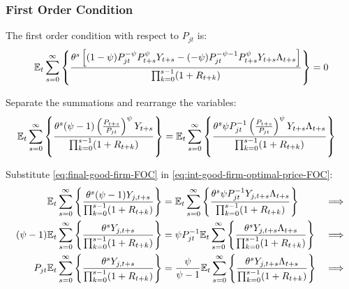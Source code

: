\documentclass[
thesis.tex
]{subfiles}
\begin{document}
	
	\subsubsection*{First Order Condition}
	
	The first order condition with respect to $P_{jt}$ is:
	\begin{align}
		& \quad {\mathbb{E}_{t}} \sum_{s=0}^{\infty} \left\{ \frac{\theta^s \left[ (1-\psi) P_{jt}^{-\psi} P_{t+s}^{\psi} Y_{t+s} - (-\psi) P_{jt}^{-\psi-1} P_{t+s}^{\psi} Y_{t+s} \Lambda_{t+s} \right] }{\prod_{k=0}^{s-1}(1+R_{t+k})} \right\} = 0 \nonumber
	\end{align}
	
	
	Separate the summations and rearrange the variables:
	\begin{align}
		\label{eq:int-good-firm-optimal-price-FOC}
		& {\mathbb{E}_{t}} \sum_{s=0}^{\infty} \left\{ \frac{\theta^s (\psi-1) \left( \frac{P_{t+s}} {P_{jt}} \right)^{\psi} Y_{t+s}} {\prod_{k=0}^{s-1} (1+R_{t+k})} \right\} = {\mathbb{E}_{t}} \sum_{s=0}^{\infty} \left\{ \frac{\theta^s \psi P_{jt}^{-1} \left( \frac{P_{t+s}} {P_{jt}} \right)^{\psi} Y_{t+s} \Lambda_{t+s} }{\prod_{k=0}^{s-1}(1+R_{t+k})} \right\}
	\end{align}
	
	
	Substitute \ref{eq:final-good-firm-FOC} in \ref{eq:int-good-firm-optimal-price-FOC}:
	\begin{alignat}{2}
		{\mathbb{E}_{t}} \sum_{s=0}^{\infty} \Bigg\{ \frac{\theta^s (\psi-1) Y_{j,t+s}}{\prod_{k=0}^{s-1}(1+R_{t+k})} \Bigg\} &= {\mathbb{E}_{t}} \sum_{s=0}^{\infty} \Bigg\{ \frac{\theta^s \psi P_{jt}^{-1} Y_{j,t+s} \Lambda_{t+s}}{\prod_{k=0}^{s-1}(1+R_{t+k})}  \Bigg\} &\implies \nonumber \\
		(\psi-1) {\mathbb{E}_{t}} \sum_{s=0}^{\infty} \Bigg\{ \frac{\theta^s Y_{j,t+s}}{\prod_{k=0}^{s-1}(1+R_{t+k})} \Bigg\} &= \psi P_{jt}^{-1} {\mathbb{E}_{t}} \sum_{s=0}^{\infty} \Bigg\{ \frac{\theta^s Y_{j,t+s} \Lambda_{t+s}}{\prod_{k=0}^{s-1}(1+R_{t+k})}  \Bigg\} &\implies \nonumber \\
		P_{jt} {\mathbb{E}_{t}} \sum_{s=0}^{\infty} \Bigg\{ \frac{\theta^s Y_{j,t+s}}{\prod_{k=0}^{s-1}(1+R_{t+k})} \Bigg\} &= \frac{\psi}{\psi-1} {\mathbb{E}_{t}} \sum_{s=0}^{\infty} \Bigg\{ \frac{\theta^s Y_{j,t+s} \Lambda_{t+s}}{\prod_{k=0}^{s-1}(1+R_{t+k})}  \Bigg\} &\implies \nonumber
	\end{alignat}
	
	\vspace*{-1cm}
	
\end{document}
